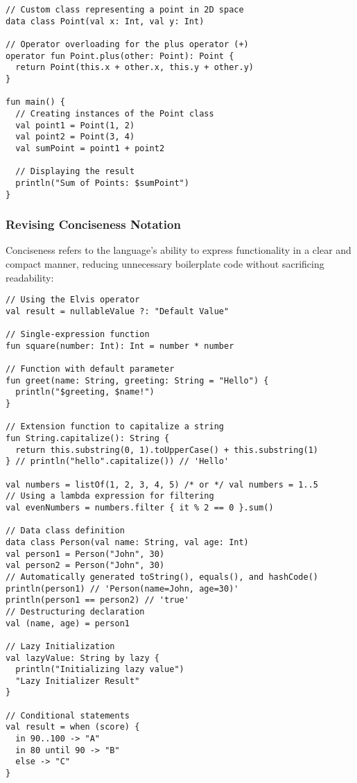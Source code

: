 \begin{lstlisting}
// Custom class representing a point in 2D space
data class Point(val x: Int, val y: Int)

// Operator overloading for the plus operator (+)
operator fun Point.plus(other: Point): Point {
  return Point(this.x + other.x, this.y + other.y)
}

fun main() {
  // Creating instances of the Point class
  val point1 = Point(1, 2)
  val point2 = Point(3, 4)
  val sumPoint = point1 + point2

  // Displaying the result
  println("Sum of Points: $sumPoint")
}
\end{lstlisting}


\newpage
\subsubsection{Revising Conciseness Notation}

Conciseness refers to the language's ability to express functionality in a clear and compact manner, reducing 
unnecessary boilerplate code without sacrificing readability:

\begin{lstlisting}
// Using the Elvis operator
val result = nullableValue ?: "Default Value"

// Single-expression function
fun square(number: Int): Int = number * number

// Function with default parameter
fun greet(name: String, greeting: String = "Hello") {
  println("$greeting, $name!")
}

// Extension function to capitalize a string
fun String.capitalize(): String {
  return this.substring(0, 1).toUpperCase() + this.substring(1)
} // println("hello".capitalize()) // 'Hello'

val numbers = listOf(1, 2, 3, 4, 5) /* or */ val numbers = 1..5
// Using a lambda expression for filtering
val evenNumbers = numbers.filter { it % 2 == 0 }.sum()

// Data class definition
data class Person(val name: String, val age: Int)
val person1 = Person("John", 30)
val person2 = Person("John", 30)
// Automatically generated toString(), equals(), and hashCode()
println(person1) // 'Person(name=John, age=30)'
println(person1 == person2) // 'true'
// Destructuring declaration
val (name, age) = person1

// Lazy Initialization
val lazyValue: String by lazy {
  println("Initializing lazy value")
  "Lazy Initializer Result"
}

// Conditional statements
val result = when (score) {
  in 90..100 -> "A"
  in 80 until 90 -> "B"
  else -> "C"
}
\end{lstlisting}


